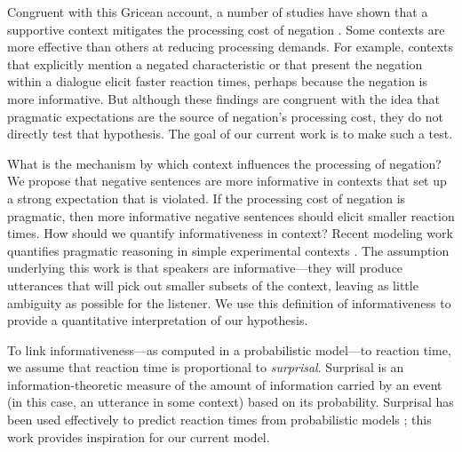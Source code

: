 \documentclass[man]{apa2}
\begin{document}
Congruent with this Gricean account, a number of studies have shown that a supportive context mitigates the processing cost of negation \cite{wason1965, glenberg1999, ludtke2006, nieuwland2008, dale2011}. Some contexts are more effective than others at reducing processing demands. For example, contexts that explicitly mention a negated characteristic \cite{ludtke2006} or that present the negation within a dialogue \cite{dale2011} elicit faster reaction times, perhaps because the negation is more informative.  But although these findings are congruent with the idea that pragmatic expectations are the source of negation's processing cost, they do not directly test that hypothesis.  The goal of our current work is to make such a test.

What is the mechanism by which context influences the processing of negation?  We propose that negative sentences are more informative in contexts that set up a strong expectation that is violated. If the processing cost of negation is pragmatic, then more informative negative sentences should elicit smaller reaction times. How should we quantify informativeness in context? Recent modeling work quantifies pragmatic reasoning in simple experimental contexts \cite{frank2012,goodman2013}. The assumption underlying this work is that speakers are informative---they will produce utterances that will pick out smaller subsets of the context, leaving as little ambiguity as possible for the listener.  We use this definition of informativeness to provide a quantitative interpretation of our hypothesis.

To link informativeness---as computed in a probabilistic model---to reaction time, we assume that reaction time is proportional to \emph{surprisal}. Surprisal is an information-theoretic measure of the amount of information carried by an event (in this case, an utterance in some context) based on its probability. Surprisal has been used effectively to predict reaction times from probabilistic models \cite{levy2008}; this work provides inspiration for our current model. 
\end{document}
